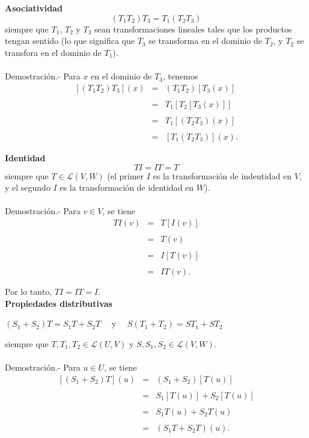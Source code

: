 \begin{myteo}\,\\\\
    \textbf{Asociatividad}
    $$(T_1T_2)T_3 = T_1(T_2T_3)$$
    siempre que $T_1$, $T_2$ y $T_3$ sean transformaciones lineales tales que los productos tengan sentido (lo que significa que $T_3$ se transforma en el dominio de $T_2$, y $T_2$ se transfora en el dominio de $T_1$).\\\\
	Demostración.-\; Para $x$ en el dominio de $T_3$, tenemos
	$$
	\begin{array}{rcl}
	    \left[(T_1T_2)T_3\right](x) &=& (T_1T_2)\left[T_3(x)\right]\\\\
					&=& T_1\left[T_2\left[T_3(x)\right]\right]\\\\
					&=& T_1\left[(T_2T_3)(x)\right]\\\\
					&=& \left[T_1(T_2T_3)\right](x).
	\end{array}
	$$

    \textbf{Identidad}
    $$TI=IT=T$$
    siempre que $T\in \mathcal{L}(V,W)$ (el primer $I$ es la transformación de indentidad en $V$, y el segundo $I$ es la transformación de identidad en $W$).\\\\
	Demostración.-\; Para $v\in V$, se tiene
	$$
	\begin{array}{rcl}
	    TI(v) &=& T\left[I(v)\right]\\\\
				 &=& T(v)\\\\
				 &=& I\left[T(v)\right]\\\\
				 &=& IT(v).\\\\
	\end{array}
	$$
	Por lo tanto, $TI=IT=I$.\\

    \textbf{Propiedades distributivas}
    \begin{center}
	$(S_1+S_2)T=S_1T+S_2T\quad$ y $\quad S(T_1+T_2)=ST_1+ST_2$
    \end{center}
    siempre que $T,T_1,T_2\in \mathcal{L}(U,V)$ y $S,S_1,S_2\in \mathcal{L}(V,W)$.\\\\
	Demostración.-\; Para $u\in U$, se tiene
	$$
	\begin{array}{rcl}
	    \left[(S_1+S_2)T\right](u) &=& (S_1+S_2)\left[T(u)\right]\\\\
				       &=& S_1\left[T(u)\right]+S_2\left[T(u)\right]\\\\
				       &=& S_1T(u)+S_2T(u)\\\\
				       &=& (S_1T+S_2T)(u).\\\\
	\end{array}
	$$


\end{myteo}
